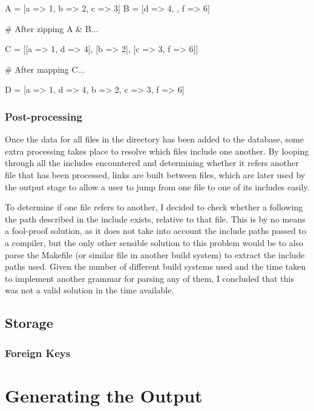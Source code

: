     \begin{code}[language=ruby, gobble=6]
      A = [{a => 1}, {b => 2}, {c => 3}]
      B = [{d => 4}, {}, {f => 6}]

      # After zipping A & B...

      C = [[{a => 1}, {d => 4}], [{b => 2}], [{c => 3}, {f => 6}]]

      # After mapping C...

      D = [{a => 1, d => 4}, {b => 2}, {c => 3, f => 6}]
    \end{code}

      \subsubsection{Post-processing}
        Once the data for all files in the directory has been added to the
        database, some extra processing takes place to resolve which files
        include one another. By looping through all the includes encountered
        and determining whether it refers another file that has been processed,
        links are built between files, which are later used by the output stage
        to allow a user to jump from one file to one of its includes easily.

        To determine if one file refers to another, I decided to check whether a
        following the path described in the include exists, relative to that
        file. This is by no means a fool-proof solution, as it does not take
        into account the include paths passed to a compiler, but the only other
        sensible solution to this problem would be to also parse the Makefile
        (or similar file in another build system) to extract the include paths
        used. Given the number of different build systems used and the time
        taken to implement another grammar for parsing any of them, I concluded
        that this was not a valid solution in the time available.

  \subsection{Storage}


    \subsubsection{Foreign Keys}

\section{Generating the Output}

